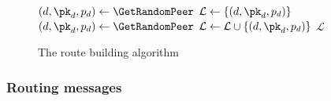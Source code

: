 \begin{figure}[t]

  \vspace{0.3em}

  \begin{algorithmic}[1]
    \Function{\CreateOnionLayer}{\null}
      \State $(d, \pk_d, p_d)\gets \GetRandomPeer$
      \State $\mathcal{L}\gets \{(d, \pk_d, p_d)\}$
        \State $(d, \pk_d, p_d)\gets \GetRandomPeer$
        \State $\mathcal{L}\gets \mathcal{L}\cup \{(d, \pk_d, p_d)\}$
      \EndWhile
      \State \Return $\mathcal{L}$
    \EndFunction
  \end{algorithmic}
  \caption{\label{fig:route building algo}The route building algorithm}
\end{figure}


\subsubsection{Routing messages}
\label{ssub:routing_messages}



